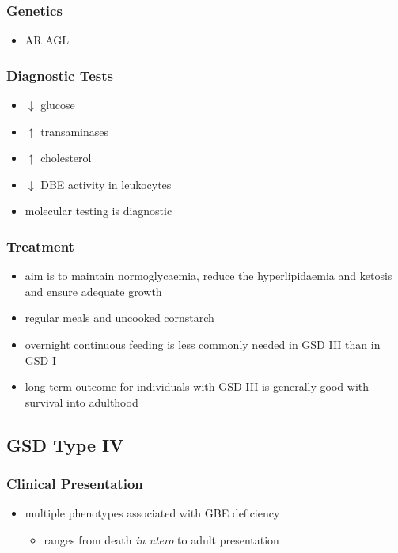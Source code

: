 \documentclass{scrartcl}
\begin{document}
\subsubsection{Genetics}
\label{sec:org96b4ebf}
\begin{itemize}
\item AR AGL
\end{itemize}
\subsubsection{Diagnostic Tests}
\label{sec:org9baf6e0}
\begin{itemize}
\item \(\downarrow\) glucose
\item \(\uparrow\) transaminases
\item \(\uparrow\) cholesterol
\item \(\downarrow\) DBE activity in leukocytes
\item molecular testing is diagnostic
\end{itemize}
\subsubsection{Treatment}
\label{sec:orgbcba3c5}
\begin{itemize}
\item aim is to maintain normoglycaemia, reduce the hyperlipidaemia and ketosis and
ensure adequate growth
\item regular meals and uncooked cornstarch
\item overnight continuous feeding is less commonly needed in GSD III than
in GSD I
\item long term outcome for individuals with GSD III is generally good
with survival into adulthood
\end{itemize}
\subsection{GSD Type IV}
\label{sec:org573ef95}
\subsubsection{Clinical Presentation}
\label{sec:org6899551}
\begin{itemize}
\item multiple phenotypes associated with GBE deficiency
\begin{itemize}
\item ranges from death \emph{in utero} to adult presentation
\end{itemize}
\end{itemize}
\end{document}
